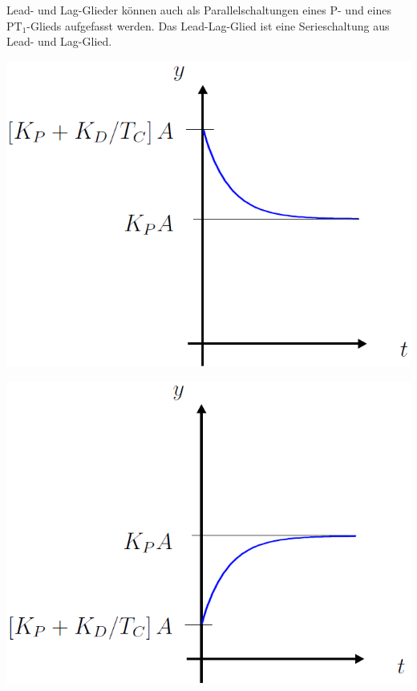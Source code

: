 Lead- und Lag-Glieder können auch als Parallelschaltungen eines P- und eines $\text{PT}_1$-Glieds aufgefasst werden. 
Das Lead-Lag-Glied ist eine Serieschaltung aus Lead- und Lag-Glied.

\begin{minipage}{0.45\columnwidth}
    \center
    \includegraphics[width=0.9\columnwidth]{images/lead-glied}
\end{minipage}
\hfill
\begin{minipage}{0.45\columnwidth}
    \center
    \includegraphics[width=0.9\columnwidth]{images/lag-glied}
\end{minipage}

